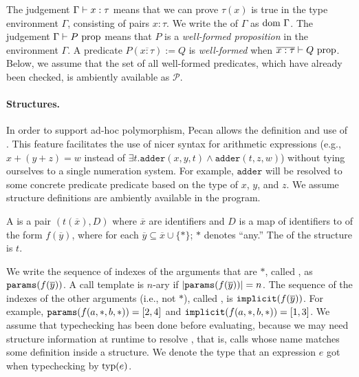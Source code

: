 The judgement $\Gamma \vdash x : \tau$ means that we can prove $\tau(x)$ is true in the type environment $\Gamma$, consisting of pairs $x : \tau$.
We write the  of $\Gamma$ as $\text{dom}~{\Gamma}$.
The judgement $\Gamma \vdash P ~ \text{prop}$ means that $P$ is a \emph{well-formed proposition} in the environment $\Gamma$.
A predicate $P(\overline{x : \tau}) := Q$ is \emph{well-formed} when $\overline{x : \tau} \vdash Q ~ \text{prop}$.
Below, we assume that the set of all well-formed predicates, which have already been checked, is ambiently available as $\mathcal{P}$.

\paragraph{Structures.}
In order to support ad-hoc polymorphism, Pecan allows the definition and use of .
This feature facilitates the use of nicer syntax for arithmetic expressions (e.g., $x + (y + z) = w$ instead of $\exists t. \texttt{adder}(x, y, t) \land \texttt{adder}(t, z, w)$) without tying ourselves to a single numeration system.
For example, $\texttt{adder}$ will be resolved to some concrete predicate predicate based on the type of $x$, $y$, and $z$.
We assume structure definitions are ambiently available in the program.

\begin{definition}
    A  is a pair $(t(\overline{x}), D)$ where $\overline{x}$ are identifiers and $D$ is a map of identifiers to  of the form $f(\overline{y})$, where for each $\overline{y} \subseteq \overline{x} \cup \{*\}$; $*$ denotes ``any.''
    The  of the structure is $t$.
\end{definition}

We write the sequence of indexes of the arguments that are $*$, called , as $\texttt{params}(f(\overline{y}))$.
A call template is $n$-ary if $|\texttt{params}(f(\overline{y}))| = n$.
The sequence of the indexes of the other arguments (i.e., not $*$), called , is $\texttt{implicit}(f(\overline{y}))$.
For example, $\texttt{params}(f(a, *, b, *)) = [2, 4]$ and $\texttt{implicit}(f(a, *, b, *)) = [1, 3]$.
We assume that typechecking has been done before evaluating, because we may need structure information at runtime to resolve , that is, calls whose name matches some definition inside a structure.
We denote the type that an expression $e$ got when typechecking by $\text{typ}{\left( {e} \right)}$.


